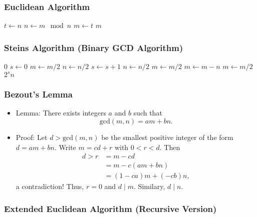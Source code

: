 \documentclass[a4paper]{scrartcl}
\begin{document}
\subsubsection*{Euclidean Algorithm}

\begin{algorithmic}[1]
\State $t \gets n$
\State $n \gets m \mod n$
\State $m \gets t$
\EndWhile
\State \Return $m$
\EndProcedure
\end{algorithmic}

\subsubsection*{Steins Algorithm (Binary GCD Algorithm)}

\begin{algorithmic}[1]
 \Return $0$ \EndIf
\State $s \gets 0$
\State $m \gets m/2$
\State $n \gets n/2$
\State $s \gets s+1$
\EndWhile
{}
\State $n \gets n/2$
\EndWhile
{}
\State $m \gets m/2$
\EndWhile
{}
\State {}
\EndIf
\State $m \gets m-n$
\State $m \gets m/2$
\EndWhile
\State \Return $2^s n$
\EndProcedure
\end{algorithmic}

\subsubsection*{Bezout's Lemma}

\begin{itemize}
\item Lemma: There exists integers $a$ and $b$ such that $$\text{gcd}(m,n) = am + bn.$$
\item Proof: Let $d > \text{gcd}(m,n)$ be the smallest positive integer of the form $d = am + bn.$ Write $m = cd + r$ with $0<r<d$. Then 
\begin{align*}
d > r &= m - cd\\
&= m-c(am + bn)\\
&= (1-ca)m + (-cb)n,
\end{align*}
a contradiction! Thus, $r = 0$ and $d \mid m$. Similary, $d \mid n$.
\end{itemize}


\subsubsection*{Extended Euclidean Algorithm (Recursive Version)}
\end{document}
